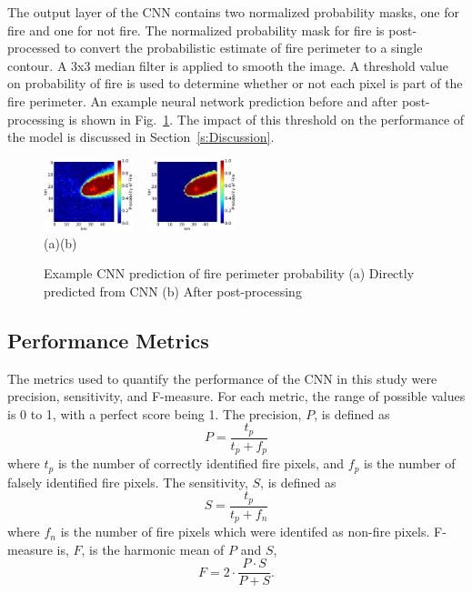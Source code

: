 \documentclass[twocolumn]{svjour3}          %
\begin{document}
The output layer of the CNN contains two normalized probability masks, one for
fire and one for not fire. The normalized probability mask for fire is
post-processed to convert the probabilistic estimate of fire perimeter to
a single contour. A 3x3 median filter is applied to smooth the image. A threshold value
on probability of fire is used to determine whether or not each pixel is part of the fire
perimeter. An example neural network prediction before and after post-processing
is shown in Fig.~\ref{fig:postProcess}.
The impact of this threshold on the performance of the model is discussed in
Section~\ref{s:Discussion}.

\begin{figure}[htb]
	\centering
	\includegraphics[width=0.23\textwidth]{exampleNetworkRaw0.png}
	~
	\includegraphics[width=0.23\textwidth]{exampleNetworkProcessed0.png}
	\\
	(a)\hspace{0.23\textwidth}(b)
\caption{Example CNN prediction of fire perimeter probability (a) Directly predicted from CNN (b) After post-processing}
\label{fig:postProcess}       %
\end{figure}



\subsection{Performance Metrics}
\label{ss:PM}

The metrics used to quantify the performance of the CNN in this study
were precision, sensitivity, and F-measure. For each metric, the range
of possible values is 0 to 1, with a perfect score being 1.
The precision, $P$, is defined as
\begin{equation}
P = \frac{t_{p}}{t_{p}+f_{p}}
\label{eq:precision}
\end{equation}
where $t_{p}$ is the number of correctly identified fire pixels, and
$f_{p}$ is the number of falsely identified fire pixels.
The sensitivity, $S$, is defined as
\begin{equation}
S = \frac{t_{p}}{t_{p}+f_{n}}
\label{eq:sensitivity}
\end{equation}
where $f_{n}$ is the number of fire pixels which were identifed
as non-fire pixels.
F-measure is, $F$, is the harmonic mean of $P$ and $S$,
\begin{equation}
F = 2\cdot\frac{P\cdot S}{P+S}.
\label{eq:fmeasure}
\end{equation}
\end{document}
